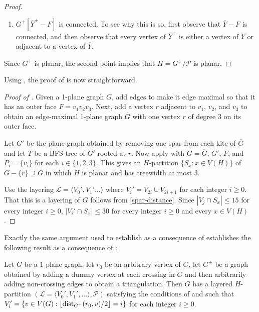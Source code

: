 \documentclass{patmorin}
\DeclareMathOperator{\dist}{dist}
\begin{document}
\begin{proof}
\begin{enumerate}
    \item $G^+[\overline{Y}^+-F]$ is connected. To see why this is so, first observe that $\overline{Y}-F$ is connected, and then observe that every vertex of $\overline{Y}^+$ is either a vertex of $\overline{Y}$ or adjacent to a vertex of $\overline{Y}$.
  \end{enumerate}
  Since $G^+$ is planar, the second point implies that $H=G^+/\mathcal{P}$ is planar.
\end{proof}

Using , the proof of  is now straightforward. 

\begin{proof}[Proof of ]
Given a 1-plane graph $G$, add edges to make it edge maximal so that it has an outer face $F=v_1v_2v_3$. Next, add a vertex $r$ adjacent to $v_1$, $v_2$, and $v_3$ to obtain an edge-maximal 1-plane graph $\overline{G}$ with one vertex $r$ of degree 3 on its outer face. 
  
  Let $G'$ be the plane graph obtained by removing one spar from each kite of $\overline{G}$ and let $T$ be a BFS tree of $G'$ rooted at $r$.  Now apply  with $G=\overline{G}$, $G'$, $F$, and $P_i=\{v_i\}$ for each $i\in\{1,2,3\}$.  This gives an $H$-partition $\{S_x:x\in V(H)\}$ of $\overline{G}-\{r\}\supseteq G$ in which $H$ is planar and has treewidth at most 3.
  
  Use the layering $\mathcal{L}=\langle V_0',V_1'\ldots\rangle$ where $V_i'=V_{2i}\cup V_{2i+1}$ for each integer $i\ge 0$. That this is a layering of $G$ follows from \eqref{spar-distance}.  Since $|V_j\cap S_x|\le 15$ for every integer $i\ge 0$, $|V_i'\cap S_x|\le 30$ for every integer $i\ge 0$ and every $x\in V(H)$.
\end{proof}

Exactly the same argument used to establish  as a consequence of  establishes the following result as a consequence of :

\begin{cor}
  Let $G$ be a $1$-plane graph, let $r_0$ be an arbitrary vertex of $G$, let $G^+$ be a graph obtained by adding a dummy vertex at each crossing in $G$ and then arbitrarily adding non-crossing edges to obtain a triangulation.  Then $G$ has a layered $H$-partition $(\mathcal{L}=\langle V_0',V_1',\ldots\rangle,\mathcal{P})$ satisfying the conditions of  and such that $V_i' = \{v\in V(G): \floor{\dist_{G^+}(r_0,v)/2}=i\}$ for each integer $i\ge 0$.
\end{cor}
\end{document}
